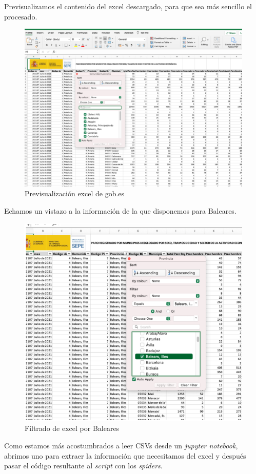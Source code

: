 \documentclass[a4paper, 12pt]{article}
\begin{document}
\begin{enumerate}
	Previsualizamos el contenido del excel descargado, para que sea más sencillo el procesado.
	
	\begin{figure}[H]
		\centering
		\includegraphics[width=0.7\linewidth]{img/screenshot021}
		\caption{Previsualización excel de gob.es}
		\label{fig:screenshot021}
	\end{figure}
	
	Echamos un vistazo a la información de la que disponemos para Baleares.
	
	\begin{figure}[H]
		\centering
		\includegraphics[width=0.7\linewidth]{img/screenshot022}
		\caption{Filtrado de excel por Baleares}
		\label{fig:screenshot022}
	\end{figure}
	
	Como estamos más acostumbrados a leer CSVs desde un {\itshape jupyter notebook}, abrimos uno para extraer la información que necesitamos del excel y después pasar el código resultante al {\itshape script} con los {\itshape spiders}.
	

\end{enumerate}
\end{document}
